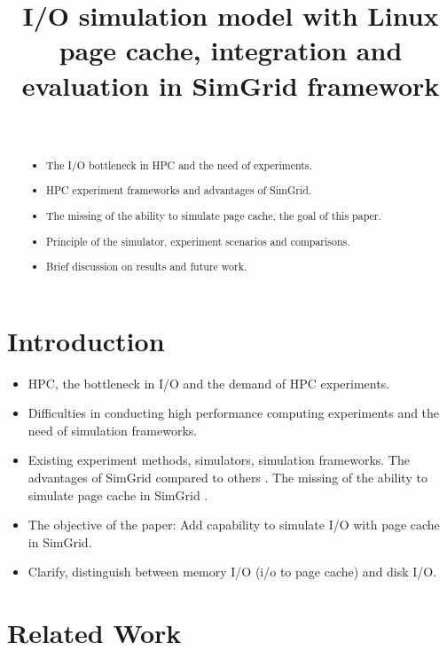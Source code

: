 \documentclass[conference]{IEEEtran}
\begin{document}
\title{I/O simulation model with Linux page cache, integration and evaluation in SimGrid framework}

\author{\\
}

\maketitle

	\begin{abstract}
		\begin{itemize}
			\item The I/O bottleneck in HPC and the need of experiments.
			\item HPC experiment frameworks and advantages of SimGrid.
			\item The missing of the ability to simulate page cache, the goal of this paper.
			\item Principle of the simulator, experiment scenarios and comparisons.
			\item Brief discussion on results and future work.
		\end{itemize}
	\end{abstract}

	\section{Introduction}
		\begin{itemize}
			\item HPC, the bottleneck in I/O and the demand of HPC experiments. 
			\item Difficulties in conducting high performance computing experiments and the need of simulation frameworks.
			\item Existing experiment methods, simulators, simulation frameworks. The advantages of SimGrid compared to others \cite{simgrid2008, lebre2015}. The missing of the ability to simulate page cache in SimGrid \cite{lebre2015}.
			\item The objective of the paper: Add capability to simulate I/O with page cache in SimGrid.
			\item Clarify, distinguish between memory I/O (i/o to page cache) and disk I/O.
		\end{itemize}
	\section{Related Work}			
		
\end{document}

